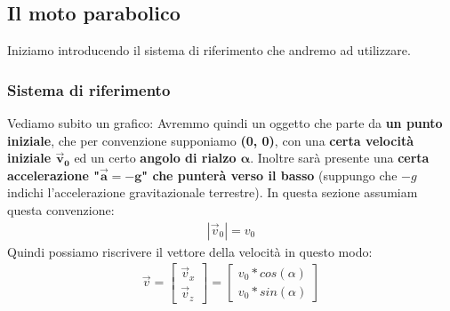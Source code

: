 		\subsection{Il moto parabolico}
			Iniziamo introducendo il sistema di riferimento che andremo ad utilizzare.
			\subsubsection{Sistema di riferimento}
				Vediamo subito un grafico:
				Avremmo quindi un oggetto che parte da \textbf{un punto iniziale}, che per convenzione supponiamo \textbf{(0, 0)}, con una \textbf{certa velocità iniziale $\bm{\vec{v}_0}$} ed un certo \textbf{angolo di rialzo $\bm{\alpha}$}. Inoltre sarà presente una \textbf{certa accelerazione "$\bm{\vec{a} = -g}$" che punterà verso il basso} (suppungo che $-g$ indichi l'accelerazione gravitazionale terrestre). In questa sezione assumiam questa convenzione:
				\begin{align*}
					|\vec{v}_0|=v_0
				\end{align*}
				Quindi possiamo riscrivere il vettore della velocità  in questo modo:
				\begin{align*}
					\vec{v}=
					\begin{bmatrix}
						\vec{v}_x\\
						\vec{v}_z
					\end{bmatrix}=
					\begin{bmatrix}
						v_0*cos(\alpha)\\
						v_0*sin(\alpha)
					\end{bmatrix}\\
				\end{align*}

